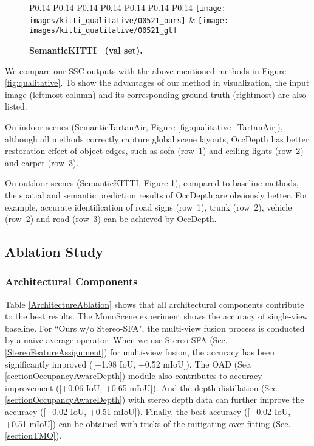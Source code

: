 \documentclass{article}
\begin{document}
\begin{figure*}[!t]
\begin{subfigure}{\linewidth}
\begin{tabular}{P{0.14\textwidth} P{0.14\textwidth} P{0.14\textwidth} P{0.14\textwidth} P{0.14\textwidth} P{0.14\textwidth} P{0.14\textwidth}}
				\texttt{[image: images/kitti\_qualitative/00521\_ours]} &
				\texttt{[image: images/kitti\_qualitative/00521\_gt]}
\end{tabular}
			\caption{\textbf{SemanticKITTI~ (val set).}}
			\label{fig:qualitative_kitti}
		\end{subfigure}
		\caption{Qualitative study on () SemanticTartanAir and () SemanticKITTI.
			The input is shown on the leftmost and the ground truth is shown on the rightmost.
			OccDepth captures better scene layout on both datasets.}
		\label{fig:qualitative}
	\end{figure*}
	We compare our SSC outputs with the above mentioned methods in Figure \ref{fig:qualitative}.
	To show the advantages of our method in visualization, the input image (leftmost column) and  its corresponding ground truth (rightmost) are also listed.

	On indoor scenes (SemanticTartanAir, Figure \ref{fig:qualitative_TartanAir}), although all methods correctly capture global scene layouts, OccDepth has better restoration effect of object edges, such as sofa (row~1) and ceiling lights (row~2) and carpet (row~3).

	On outdoor scenes (SemanticKITTI, Figure \ref{fig:qualitative_kitti}), compared to baseline methods, the spatial and semantic prediction results of OccDepth are obviously better.
	For example, accurate identification of road signs (row~1), trunk (row~2), vehicle (row~2) and road (row~3) can be achieved by OccDepth.



 
	\subsection{Ablation Study}
	\label{AblationStudy}
	
	
	\subsubsection{Architectural Components}
	Table \ref{ArchitectureAblation} shows that all architectural components contribute to the best results.	
	The MonoScene experiment shows the accuracy of single-view baseline. For ``Ours w/o Stereo-SFA", the multi-view fusion process is conducted by a naive average operator.
	When we use Stereo-SFA (Sec. \ref{StereoFeatureAssignment}) for multi-view fusion, the accuracy has been significantly improved ([+1.98 IoU, +0.52 mIoU]).
	The OAD (Sec. \ref{sectionOccupancyAwareDepth}) module also contributes to accuracy improvement ([+0.06 IoU, +0.65 mIoU]).
	And the depth distillation (Sec. \ref{sectionOccupancyAwareDepth}) with stereo depth data can further improve the accuracy ([+0.02 IoU, +0.51 mIoU]).
	Finally, the best accuracy ([+0.02 IoU, +0.51 mIoU]) can be obtained with tricks of the mitigating over-fitting  (Sec. \ref{sectionTMO}).
\end{document}
